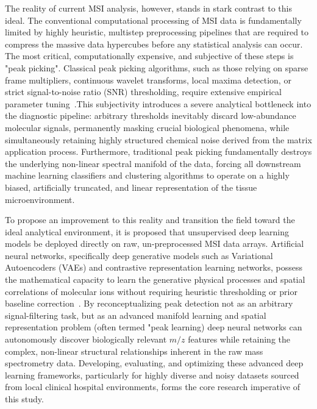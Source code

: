 \documentclass[
12pt, %
oneside, %
english, %
onehalfspacing, %
nolistspacing, %
headsepline, %
]{MastersDoctoralThesis} %
\begin{document}
The reality of current MSI analysis, however, stands in stark contrast to this ideal. The conventional computational processing of MSI data is fundamentally limited by highly heuristic, multistep preprocessing pipelines that are required to compress the massive data hypercubes before any statistical analysis can occur. The most critical, computationally expensive, and subjective of these steps is "peak picking". Classical peak picking algorithms, such as those relying on sparse frame multipliers, continuous wavelet transforms, local maxima detection, or strict signal-to-noise ratio (SNR) thresholding, require extensive empirical parameter tuning~\citep{lieb2020sparse}.This subjectivity introduces a severe analytical bottleneck into the diagnostic pipeline: arbitrary thresholds inevitably discard low-abundance molecular signals, permanently masking crucial biological phenomena, while simultaneously retaining highly structured chemical noise derived from the matrix application process. Furthermore, traditional peak picking fundamentally destroys the underlying non-linear spectral manifold of the data, forcing all downstream machine learning classifiers and clustering algorithms to operate on a highly biased, artificially truncated, and linear representation of the tissue microenvironment. \citep{abdelmoula2021peak}

To propose an improvement to this reality and transition the field toward the ideal analytical environment, it is proposed that unsupervised deep learning models be deployed directly on raw, un-preprocessed MSI data arrays. Artificial neural networks, specifically deep generative models such as Variational Autoencoders (VAEs) and contrastive representation learning networks, possess the mathematical capacity to learn the generative physical processes and spatial correlations of molecular ions without requiring heuristic thresholding or prior baseline correction~\citep{abdelmoula2021peak}. By reconceptualizing peak detection not as an arbitrary signal-filtering task, but as an advanced manifold learning and spatial representation problem (often termed "peak learning) deep neural networks can autonomously discover biologically relevant $m/z$ features while retaining the complex, non-linear structural relationships inherent in the raw mass spectrometry data. Developing, evaluating, and optimizing these advanced deep learning frameworks, particularly for highly diverse and noisy datasets sourced from local clinical hospital environments, forms the core research imperative of this study. \citep{guo2024deepion}
\end{document}

